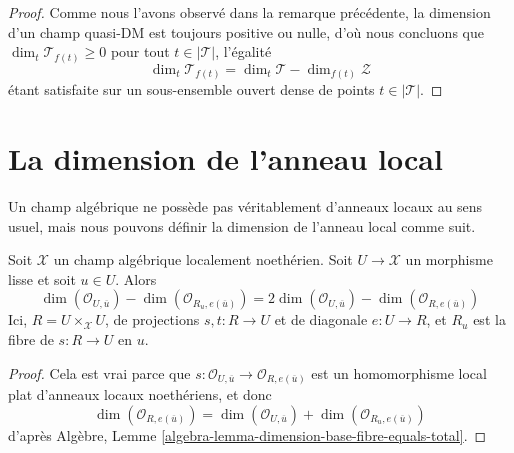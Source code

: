 \begin{proof}
Comme nous l'avons observé dans la remarque précédente,
la dimension d'un champ quasi-DM est toujours positive ou nulle,
d'où nous concluons que $\dim_t \mathcal{T}_{f(t)} \geq 0$
pour tout $t \in |\mathcal{T}|$, l'égalité
$$
\dim_t \mathcal{T}_{f(t)} = \dim_t \mathcal{T} - \dim_{f(t)} \mathcal{Z}
$$
étant satisfaite
sur un sous-ensemble ouvert dense de points $t\in |\mathcal{T}|$.
\end{proof}





\section{La dimension de l'anneau local}
\label{section-dimension-local-ring}

\noindent
Un champ algébrique ne possède pas véritablement d'anneaux locaux au sens usuel,
mais nous pouvons définir la dimension de l'anneau local comme suit.

\begin{lemma}
\label{lemma-dimension-local-ring-pre}
Soit $\mathcal{X}$ un champ algébrique localement noethérien.
Soit $U \to \mathcal{X}$ un morphisme lisse et soit $u \in U$.
Alors
$$
\dim(\mathcal{O}_{U, \overline{u}}) -
\dim(\mathcal{O}_{R_u, e(\overline{u})}) =
2\dim(\mathcal{O}_{U, \overline{u}}) -
\dim(\mathcal{O}_{R, e(\overline{u})})
$$
Ici, $R = U \times_\mathcal{X} U$, de projections $s, t : R \to U$ et de
diagonale $e : U \to R$, et $R_u$ est la fibre de $s : R \to U$ en $u$.
\end{lemma}

\begin{proof}
Cela est vrai parce que
$s : \mathcal{O}_{U, \overline{u}} \to \mathcal{O}_{R, e(\overline{u})}$
est un homomorphisme local plat d'anneaux locaux noethériens, et donc
$$
\dim(\mathcal{O}_{R, e(\overline{u})}) =
\dim(\mathcal{O}_{U, \overline{u}}) +
\dim(\mathcal{O}_{R_u, e(\overline{u})})
$$
d'après
Algèbre, Lemme \ref{algebra-lemma-dimension-base-fibre-equals-total}.
\end{proof}

